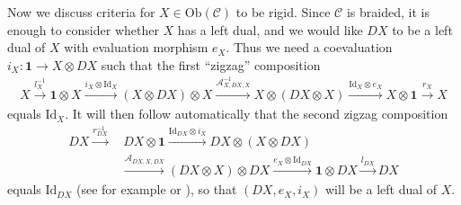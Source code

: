 \documentclass[11pt, reqno]{amsart}
\theoremstyle{definition}\newtheorem{defi}[thm]{Definition}
\theoremstyle{definition}\newtheorem{rem}[thm]{Remark}
\theoremstyle{definition}\newtheorem{exam}[thm]{Example}
\theoremstyle{definition}\newtheorem{assum}[thm]{Assumption}
\newcommand{\cA}{\mathcal{A}}
\newcommand{\cC}{\mathcal{C}}
\newcommand{\Id}{\mathrm{Id}}
\newcommand{\vac}{\mathbf{1}}
\begin{document}
Now we discuss criteria for $X\in\mathrm{Ob}(\cC)$ to be rigid. Since $\cC$ is braided, it is enough to consider whether $X$ has a left dual, and we would like $DX$ to be a left dual of $X$ with evaluation morphism $e_X$. Thus we need a coevaluation $i_X: \vac\rightarrow X\otimes DX$ such that the first ``zigzag'' composition
\begin{align*}
X\xrightarrow{l_X^{-1}} \vac\otimes X\xrightarrow{i_X\otimes\Id_X} (X\otimes DX)\otimes X\xrightarrow{\cA_{X,DX,X}^{-1}} X\otimes(DX\otimes X)\xrightarrow{\Id_X\otimes e_X} X\otimes\vac\xrightarrow{r_X} X
\end{align*}
equals $\Id_X$. It will then follow automatically that the second zigzag composition
\begin{align*}
DX\xrightarrow{r_{DX}^{-1}} &\, DX\otimes\vac  \xrightarrow{\Id_{DX}\otimes i_X} DX\otimes (X\otimes DX)\\
&\xrightarrow{\cA_{DX,X,DX}} (DX\otimes X)\otimes DX\xrightarrow{e_X\otimes\Id_{DX}} \vac\otimes DX\xrightarrow{l_{DX}} DX
\end{align*}
equals $\Id_{DX}$ (see for example \cite[Lemma 4.1]{CMY3} or \cite[Lemma 2.1]{EP}), so that $(DX, e_X, i_X)$ will be a left dual of $X$.
\end{document}
